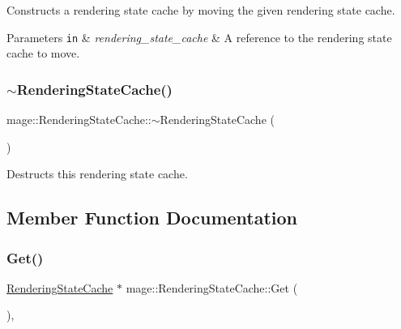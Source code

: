Constructs a rendering state cache by moving the given rendering state cache.


\begin{DoxyParams}[1]{Parameters}
\mbox{\tt in}  & {\em rendering\+\_\+state\+\_\+cache} & A reference to the rendering state cache to move. \\
\hline
\end{DoxyParams}
\hypertarget{structmage_1_1_rendering_state_cache_ac727351db3d929df122327887edc3668}{}\label{structmage_1_1_rendering_state_cache_ac727351db3d929df122327887edc3668} 
\subsubsection{\texorpdfstring{$\sim$\+Rendering\+State\+Cache()}{~RenderingStateCache()}}
{\footnotesize\ttfamily mage\+::\+Rendering\+State\+Cache\+::$\sim$\+Rendering\+State\+Cache (\begin{DoxyParamCaption}{ }\end{DoxyParamCaption})\hspace{0.3cm}{\ttfamily [default]}}

Destructs this rendering state cache. 

\subsection{Member Function Documentation}
\hypertarget{structmage_1_1_rendering_state_cache_a1792e037c8847d1d35219305bce42c52}{}\label{structmage_1_1_rendering_state_cache_a1792e037c8847d1d35219305bce42c52} 
\subsubsection{\texorpdfstring{Get()}{Get()}}
{\footnotesize\ttfamily \hyperlink{structmage_1_1_rendering_state_cache}{Rendering\+State\+Cache} $\ast$ mage\+::\+Rendering\+State\+Cache\+::\+Get (\begin{DoxyParamCaption}{ }\end{DoxyParamCaption})\hspace{0.3cm}{\ttfamily [static]}, {\ttfamily [noexcept]}}

